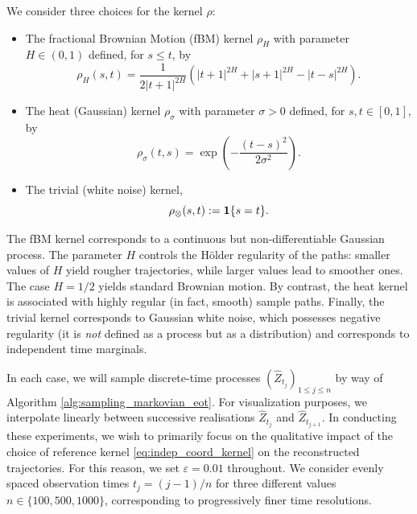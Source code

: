 \documentclass[]{article}
\numberwithin{equation}{section}
\theoremstyle{plain}
\begin{document}
{We consider three choices for the kernel $\rho$: 

\begin{itemize}
\item The fractional Brownian Motion (fBM) kernel $\rho_H$ with parameter $H \in (0,1)$ defined, for $s \leq t$, by
\begin{equation}\label{eq:fbm_kernel}
\rho_H(s,t) = \frac{1}{2|t+1|^{2H}}\left(|t+1|^{2H} + |s+1|^{2H} - |t-s|^{2H}\right).
\end{equation}


\item The heat (Gaussian) kernel $\rho_\sigma$ with parameter $\sigma > 0$ defined, for $s,t \in [0,1]$, by
\begin{equation}\label{eq:heat_kernel}
\rho_{\sigma}(t,s) = \exp\left(-\frac{(t-s)^2}{2 \sigma^2}\right).
\end{equation}

\item The trivial (white noise) kernel,
\begin{equation}\label{eq:trivial_kernel}\rho_{\otimes}(s,t):={\bf 1}\{s=t\}.
\end{equation}
\end{itemize}
The fBM kernel corresponds to a continuous but non-differentiable Gaussian process. The parameter $H$ controls the Hölder regularity of the paths: smaller values of $H$ yield rougher trajectories, while larger values lead to smoother ones. The case $H=1/2$ yields standard Brownian motion. By contrast, the heat kernel is associated with highly regular (in fact, smooth) sample paths. Finally, the trivial kernel corresponds to Gaussian white noise, which possesses negative regularity (it is \emph{not} defined as a process but as a distribution) and corresponds to independent time marginals.

In each case, we will sample discrete-time processes $(\widehat{Z}_{t_j})_{1 \leq j \leq n}$ by way of  Algorithm \ref{alg:sampling_markovian_eot}. For visualization purposes, we interpolate linearly between successive realisations $\widehat{Z}_{t_{j}}$ and $\widehat{Z}_{t_{j+1}}$. 
 In conducting these experiments, we wish to primarily focus on the qualitative impact of the choice of reference kernel \eqref{eq:indep_coord_kernel} on the reconstructed trajectories. For this reason, we set $\varepsilon = 0.01$ throughout. We consider evenly spaced observation times $t_j=(j-1)/n$ for three different values $n \in \{100, 500, 1000\}$, corresponding to progressively finer time resolutions. 
 
}
\end{document}
